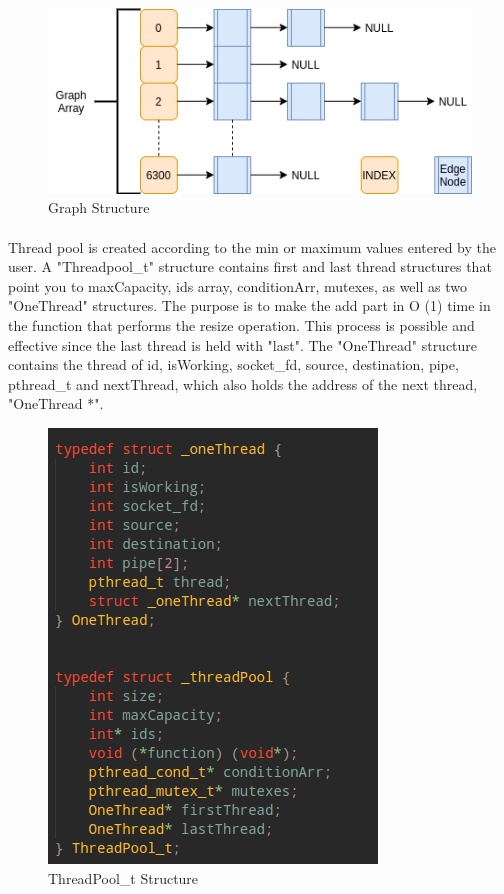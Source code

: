 \documentclass[a4paper,12pt]{report}
\begin{document}
\begin{figure}[h!]
\centering
\includegraphics[scale=0.75]{2_graph.png}
\caption{Graph Structure}
\label{fig:compile}
\end{figure}

\paragraph{}
Thread pool is created according to the min or maximum values entered by the user. A "Threadpool\_t" structure contains first and last thread structures that point you to maxCapacity, ids array, conditionArr, mutexes, as well as two "OneThread" structures. The purpose is to make the add part in O (1) time in the function that performs the resize operation. This process is possible and effective since the last thread is held with "last". The "OneThread" structure contains the thread of id, isWorking, socket\_fd, source, destination, pipe, pthread\_t and nextThread, which also holds the address of the next thread, "OneThread *".

\begin{figure}[h!]
\centering
\includegraphics[scale=0.75]{3_threadpool.png}
\caption{ThreadPool\_t Structure}
\label{fig:compile}
\end{figure}
\end{document}
